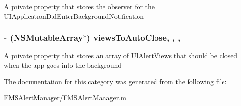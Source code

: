 A private property that stores the observer for the U\-I\-Application\-Did\-Enter\-Background\-Notification \hypertarget{category_f_m_s_alert_manager_07_08_a07886820bd55952f2a3ef1e1028ad85e}{
\subsubsection[{views\-To\-Auto\-Close}]{\setlength{\rightskip}{0pt plus 5cm}-\/ (N\-S\-Mutable\-Array$\ast$) views\-To\-Auto\-Close\hspace{0.3cm}{\ttfamily [read]}, {\ttfamily [write]}, {\ttfamily [nonatomic]}, {\ttfamily [strong]}}}\label{category_f_m_s_alert_manager_07_08_a07886820bd55952f2a3ef1e1028ad85e}
A private property that stores an array of U\-I\-Alert\-Views that should be closed when the app goes into the background 

The documentation for this category was generated from the following file\-:\begin{DoxyCompactItemize}
\item 
F\-M\-S\-Alert\-Manager/F\-M\-S\-Alert\-Manager.\-m\end{DoxyCompactItemize}
